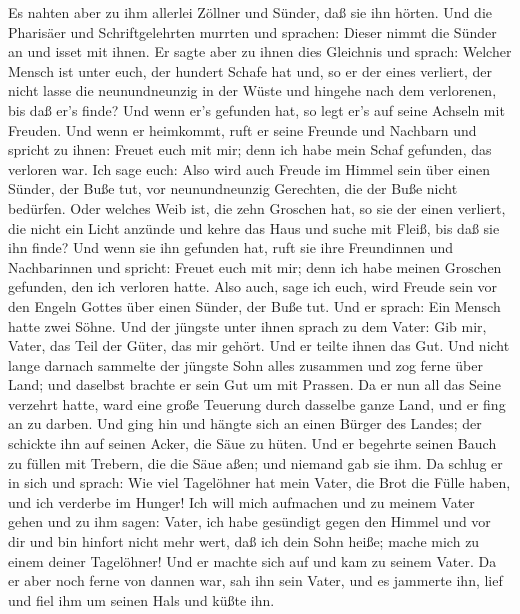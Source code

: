  Es nahten aber zu ihm allerlei Zöllner und Sünder, daß sie
ihn hörten.  Und die Pharisäer und Schriftgelehrten murrten
und sprachen: Dieser nimmt die Sünder an und isset mit ihnen.
 Er sagte aber zu ihnen dies Gleichnis und sprach:
 Welcher Mensch ist unter euch, der hundert Schafe hat und,
so er der eines verliert, der nicht lasse die neunundneunzig in der
Wüste und hingehe nach dem verlorenen, bis daß er's finde? 
Und wenn er's gefunden hat, so legt er's auf seine Achseln mit Freuden.
 Und wenn er heimkommt, ruft er seine Freunde und Nachbarn
und spricht zu ihnen: Freuet euch mit mir; denn ich habe mein Schaf
gefunden, das verloren war.  Ich sage euch: Also wird auch
Freude im Himmel sein über einen Sünder, der Buße tut, vor
neunundneunzig Gerechten, die der Buße nicht bedürfen.  Oder
welches Weib ist, die zehn Groschen hat, so sie der einen verliert, die
nicht ein Licht anzünde und kehre das Haus und suche mit Fleiß, bis daß
sie ihn finde?  Und wenn sie ihn gefunden hat, ruft sie ihre
Freundinnen und Nachbarinnen und spricht: Freuet euch mit mir; denn ich
habe meinen Groschen gefunden, den ich verloren hatte. 
Also auch, sage ich euch, wird Freude sein vor den Engeln Gottes über
einen Sünder, der Buße tut.  Und er sprach: Ein Mensch
hatte zwei Söhne.  Und der jüngste unter ihnen sprach zu
dem Vater: Gib mir, Vater, das Teil der Güter, das mir gehört. Und er
teilte ihnen das Gut.  Und nicht lange darnach sammelte der
jüngste Sohn alles zusammen und zog ferne über Land; und daselbst
brachte er sein Gut um mit Prassen.  Da er nun all das
Seine verzehrt hatte, ward eine große Teuerung durch dasselbe ganze
Land, und er fing an zu darben.  Und ging hin und hängte
sich an einen Bürger des Landes; der schickte ihn auf seinen Acker, die
Säue zu hüten.  Und er begehrte seinen Bauch zu füllen mit
Trebern, die die Säue aßen; und niemand gab sie ihm.  Da
schlug er in sich und sprach: Wie viel Tagelöhner hat mein Vater, die
Brot die Fülle haben, und ich verderbe im Hunger!  Ich will
mich aufmachen und zu meinem Vater gehen und zu ihm sagen: Vater, ich
habe gesündigt gegen den Himmel und vor dir  und bin
hinfort nicht mehr wert, daß ich dein Sohn heiße; mache mich zu einem
deiner Tagelöhner!  Und er machte sich auf und kam zu
seinem Vater. Da er aber noch ferne von dannen war, sah ihn sein Vater,
und es jammerte ihn, lief und fiel ihm um seinen Hals und küßte ihn.
